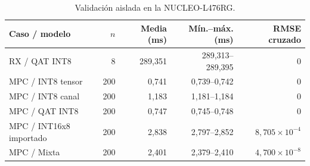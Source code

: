 \begin{table}[H]
\centering\small
\caption{Validación aislada en la NUCLEO-L476RG.}\label{tab:nucleo_validacion}
\begin{tabularx}{\linewidth}{Yrrrr}\toprule
Caso / modelo & $n$ & Media (ms) & Mín.--máx. (ms) & RMSE cruzado\\\midrule
RX / QAT INT8 & 8 & 289,351 & 289,313--289,395 & 0\\
MPC / INT8 tensor & 200 & 0,741 & 0,739--0,742 & 0\\
MPC / INT8 canal & 200 & 1,183 & 1,181--1,184 & 0\\
MPC / QAT INT8 & 200 & 0,747 & 0,745--0,748 & 0\\
MPC / INT16x8 importado & 200 & 2,838 & 2,797--2,852 & $8,705\times10^{-4}$\\
MPC / Mixta & 200 & 2,401 & 2,379--2,410 & $4,700\times10^{-8}$\\
\bottomrule\end{tabularx}
\end{table}
